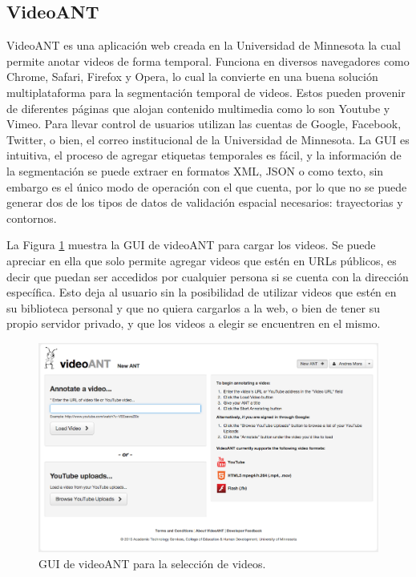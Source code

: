 \subsection{VideoANT}

VideoANT es una aplicación web creada en la Universidad de Minnesota la cual permite anotar videos de forma temporal. Funciona en diversos navegadores como Chrome, Safari, Firefox y Opera, lo cual la convierte en una buena solución multiplataforma para la segmentación temporal de videos. Estos pueden provenir de diferentes páginas que alojan contenido multimedia como lo son Youtube y Vimeo. Para llevar control de usuarios utilizan las cuentas de Google, Facebook, Twitter, o bien, el correo institucional de la Universidad de Minnesota. La GUI es intuitiva, el proceso de agregar etiquetas temporales es fácil, y la información de la segmentación se puede extraer en formatos XML, JSON o como texto, sin embargo es el único modo de operación con el que cuenta, por lo que no se puede generar dos de los tipos de datos de validación espacial necesarios: trayectorias y contornos.

La Figura \ref{fig:ant1} muestra la GUI de videoANT para cargar los videos. Se puede apreciar en ella que solo permite agregar videos que estén en URLs públicos, es decir que puedan ser accedidos por cualquier persona si se cuenta con la dirección específica. Esto deja al usuario sin la posibilidad de utilizar videos que estén en su biblioteca personal y que no quiera cargarlos a la web, o bien de tener su propio servidor privado, y que los videos a elegir se encuentren en el mismo.

\begin{figure}
	\includegraphics[width=1\linewidth]{images/ant1}
	\caption{GUI de videoANT para la selección de videos.} \label{fig:ant1}
\end{figure}

